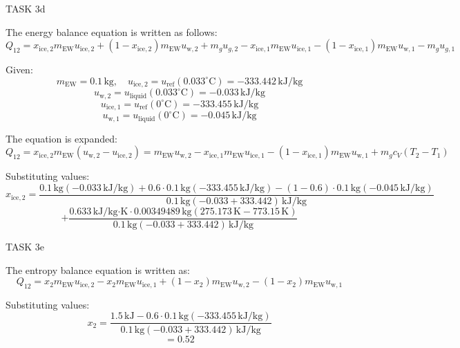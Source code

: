 TASK 3d

The energy balance equation is written as follows:
\[
Q_{12} = x_{\text{ice},2} m_{\text{EW}} u_{\text{ice},2} + (1 - x_{\text{ice},2}) m_{\text{EW}} u_{\text{w},2} + m_g u_{g,2} - x_{\text{ice},1} m_{\text{EW}} u_{\text{ice},1} - (1 - x_{\text{ice},1}) m_{\text{EW}} u_{\text{w},1} - m_g u_{g,1}
\]

Given:
\[
m_{\text{EW}} = 0.1 \, \text{kg}, \quad u_{\text{ice},2} = u_{\text{ref}}(0.033^\circ\text{C}) = -333.442 \, \text{kJ/kg}
\]
\[
u_{\text{w},2} = u_{\text{liquid}}(0.033^\circ\text{C}) = -0.033 \, \text{kJ/kg}
\]
\[
u_{\text{ice},1} = u_{\text{ref}}(0^\circ\text{C}) = -333.455 \, \text{kJ/kg}
\]
\[
u_{\text{w},1} = u_{\text{liquid}}(0^\circ\text{C}) = -0.045 \, \text{kJ/kg}
\]

The equation is expanded:
\[
Q_{12} = x_{\text{ice},2} m_{\text{EW}} (u_{\text{w},2} - u_{\text{ice},2}) = m_{\text{EW}} u_{\text{w},2} - x_{\text{ice},1} m_{\text{EW}} u_{\text{ice},1} - (1 - x_{\text{ice},1}) m_{\text{EW}} u_{\text{w},1} + m_g c_V (T_2 - T_1)
\]

Substituting values:
\[
x_{\text{ice},2} = \frac{0.1 \, \text{kg} (-0.033 \, \text{kJ/kg}) + 0.6 \cdot 0.1 \, \text{kg} (-333.455 \, \text{kJ/kg}) - (1 - 0.6) \cdot 0.1 \, \text{kg} (-0.045 \, \text{kJ/kg})}{0.1 \, \text{kg} (-0.033 + 333.442) \, \text{kJ/kg}}
\]
\[
+ \frac{0.633 \, \text{kJ/kg·K} \cdot 0.00349489 \, \text{kg} (275.173 \, \text{K} - 773.15 \, \text{K})}{0.1 \, \text{kg} (-0.033 + 333.442) \, \text{kJ/kg}}
\]

TASK 3e

The entropy balance equation is written as:
\[
Q_{12} = x_2 m_{\text{EW}} u_{\text{ice},2} - x_2 m_{\text{EW}} u_{\text{ice},1} + (1 - x_2) m_{\text{EW}} u_{\text{w},2} - (1 - x_2) m_{\text{EW}} u_{\text{w},1}
\]

Substituting values:
\[
x_2 = \frac{1.5 \, \text{kJ} - 0.6 \cdot 0.1 \, \text{kg} (-333.455 \, \text{kJ/kg})}{0.1 \, \text{kg} (-0.033 + 333.442) \, \text{kJ/kg}}
\]
\[
= 0.52
\]